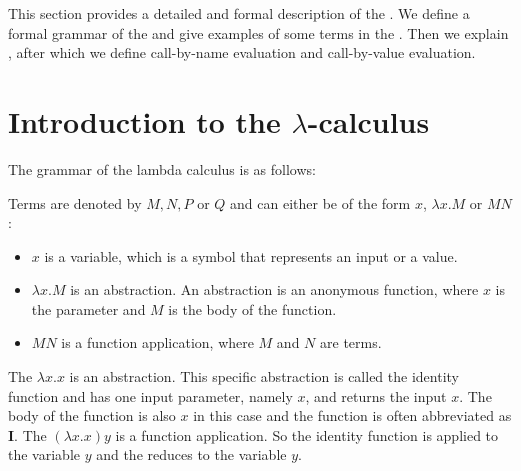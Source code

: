 


This section provides a detailed and formal description of the \lc. We define a formal grammar of the \lc and give examples of some terms in the \lc.
Then we explain \br, after which we define call-by-name evaluation and call-by-value evaluation.


\section{\texorpdfstring{Introduction to the \boldmath$\lambda$-calculus}{Introduction to the Lambda Calculus}}
The grammar of the lambda calculus is as follows:

\vspace{10pt}
\begin{grammar}{
	}
\end{grammar}

\vspace{10pt}
Terms are denoted by $M, N, P$ or $Q$ and can either be of the form $x$, $\lambda x.M$ or $M N$:
\begin{itemize}[noitemsep]
	\item $x$ is a variable, which is a symbol that represents an input or a value.
	\item $\lambda x.M$ is an abstraction. An abstraction is an anonymous function, where $x$ is the parameter and $M$ is the body of the function.
	\item $M N$ is a function application, where $M$ and $N$ are terms.
\end{itemize}

The \lterm $\lambda x. x$ is an abstraction. This specific abstraction is called the identity function and has one input parameter, namely $x$, and returns the input $x$.
The body of the function is also $x$ in this case and the function is often abbreviated as $\mathbf{I}$. 
The \lterm $(\lambda x. x) y$ is a function application. So the identity function is applied to the variable $y$ and the \lterm reduces to the variable $y$.
